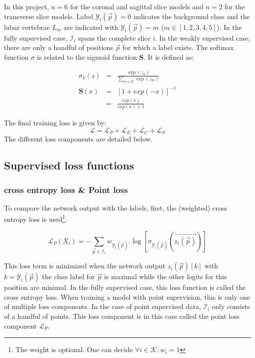 \par{
    In this project, $n=6$ for the coronal and sagittal slice models and $n=2$ for the transverse slice models. 
    Label $\mathcal{Y}_i(\vec{p})=0$ indicates the background class and the lubar vertebrae $L_m$ are indicated with $\mathcal{Y}_i(\vec{p})=m$ ($m\in[1,2,3,4,5]$).
    In the fully supervised case, $\mathcal{I}_i$ spans the complete slice $i$. In the weakly supervised case, there are only a handful of positions $\vec{p}$ for which a label exists.
}
The softmax function $\sigma$ is related to the sigmoid function $\mathbf{S}$. It is defined as:

\begin{eqnarray}
    \sigma_k(z) &=& \frac{\exp(z_k)}{\sum_{m\in\mathcal{K}} \exp(z_m)} \\
    \mathbf{S}(x) &=& \left[ 1+ exp(-x) \right]^{-1} \\ &=& \frac{exp(x)}{exp(x) + 1} 
\end{eqnarray}

The final training loss is given by:
\begin{equation}
    \mathcal{L} = \mathcal{L}_P + \mathcal{L}_E + \mathcal{L}_C + \mathcal{L}_S
\end{equation}
The different loss components are detailed below.

\subsection{Supervised loss functions}

\subsubsection{cross entropy loss \& Point loss \label{sec:crossentropy}}
To compare the network output with the labels, first, the (weighted) cross entropy loss is used\footnote{The weight is optional. One can decide $\forall i\in\mathcal{K}: w_i=1$}.

\begin{equation}
\mathcal{L}_P(X_i) = -\sum_{\vec{p} \in \mathcal{I}_i} w_{\mathcal{Y}_i(\vec{p})}.\log\left[\sigma_{\mathcal{Y}_i(\vec{p})}\left(\vec{z_i(\vec{p})}\right)\right]
\label{eq:LP}
\end{equation}

This loss term is minimized when the network output $z_i(\vec{p})[k]$ with $k=\mathcal{Y}_i(\vec{p})$ the class label for $\vec{p}$ is maximal while the other logits for this position are minimal.
In the fully supervised case, this loss function is called the cross entropy loss. 
When training a model with point supervision, this is only one of multiple loss components. 
In the case of point supervised data, $\mathcal{I}_i$ only consists of a handful of points.
This loss component is in this case called the point loss component $\mathcal{L}_P$.

